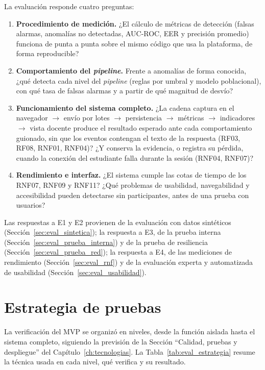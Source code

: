 La evaluación responde cuatro preguntas:

\begin{enumerate}[label=\textbf{E\arabic*.}]
    \item \textbf{Procedimiento de medición.} ¿El cálculo de métricas de detección (falsas alarmas, anomalías no detectadas, AUC-ROC, EER y precisión promedio) funciona de punta a punta sobre el mismo código que usa la plataforma, de forma reproducible?
    \item \textbf{Comportamiento del \textit{pipeline}.} Frente a anomalías de forma conocida, ¿qué detecta cada nivel del \textit{pipeline} (reglas por umbral y modelo poblacional), con qué tasa de falsas alarmas y a partir de qué magnitud de desvío?
    \item \textbf{Funcionamiento del sistema completo.} ¿La cadena captura en el navegador $\to$ envío por lotes $\to$ persistencia $\to$ métricas $\to$ indicadores $\to$ vista docente produce el resultado esperado ante cada comportamiento guionado, sin que los eventos contengan el texto de la respuesta (RF03, RF08, RNF01, RNF04)? ¿Y conserva la evidencia, o registra su pérdida, cuando la conexión del estudiante falla durante la sesión (RNF04, RNF07)?
    \item \textbf{Rendimiento e interfaz.} ¿El sistema cumple las cotas de tiempo de los RNF07, RNF09 y RNF11? ¿Qué problemas de usabilidad, navegabilidad y accesibilidad pueden detectarse sin participantes, antes de una prueba con usuarios?
\end{enumerate}

Las respuestas a E1 y E2 provienen de la evaluación con datos sintéticos (Sección~\ref{sec:eval_sintetica}); la respuesta a E3, de la prueba interna (Sección~\ref{sec:eval_prueba_interna}) y de la prueba de resiliencia (Sección~\ref{sec:eval_prueba_red}); la respuesta a E4, de las mediciones de rendimiento (Sección~\ref{sec:eval_rnf}) y de la evaluación experta y automatizada de usabilidad (Sección~\ref{sec:eval_usabilidad}).

\section{Estrategia de pruebas}
\label{sec:eval_estrategia}

La verificación del MVP se organizó en niveles, desde la función aislada hasta el sistema completo, siguiendo la previsión de la Sección ``Calidad, pruebas y despliegue'' del Capítulo~\ref{ch:tecnologias}. La Tabla~\ref{tab:eval_estrategia} resume la técnica usada en cada nivel, qué verifica y su resultado.


